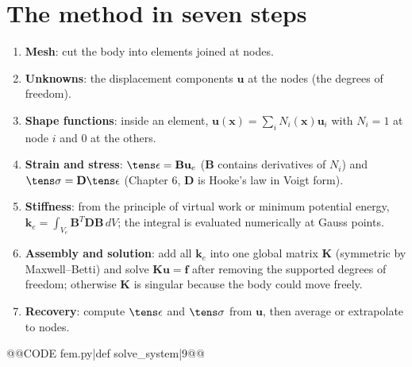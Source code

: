 {{{{{\section{The method in seven steps}
\begin{enumerate}[nosep]
\item \textbf{Mesh}: cut the body into elements joined at nodes.
\item \textbf{Unknowns}: the displacement components $\mathbf u$ at the nodes (the degrees of freedom).
\item \textbf{Shape functions}: inside an element, $\mathbf u(\mathbf x)=\sum_iN_i(\mathbf x)\mathbf u_i$ with $N_i=1$ at node $i$ and $0$ at the others.
\item \textbf{Strain and stress}: $\tens\epsilon=\mathbf B\mathbf u_e$ ($\mathbf B$ contains derivatives of $N_i$) and $\tens\sigma=\mathbf D\tens\epsilon$ (Chapter 6, $\mathbf D$ is Hooke's law in Voigt form).
\item \textbf{Stiffness}: from the principle of virtual work or minimum potential energy, $\mathbf k_e=\int_{V_e}\mathbf B^T\mathbf D\mathbf B\,dV$; the integral is evaluated numerically at Gauss points.
\item \textbf{Assembly and solution}: add all $\mathbf k_e$ into one global matrix $\mathbf K$ (symmetric by Maxwell--Betti) and solve $\mathbf K\mathbf u=\mathbf f$ after removing the supported degrees of freedom; otherwise $\mathbf K$ is singular because the body could move freely.
\item \textbf{Recovery}: compute $\tens\epsilon$ and $\tens\sigma$ from $\mathbf u$, then average or extrapolate to nodes.
\end{enumerate}
@@CODE fem.py|def solve_system|9@@

}}}}}
